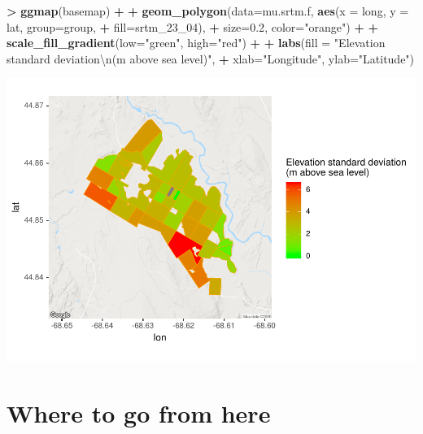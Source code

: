 \documentclass[
]{krantz}
\makeatletter
\newenvironment{Shaded}{\begin{snugshade}}{\end{snugshade}}
\newcommand{\CharTok}[1]{\textcolor[rgb]{0.5,0.5,0.5}{#1}}
\newcommand{\DataTypeTok}[1]{\textcolor[rgb]{0.27,0.27,0.27}{#1}}
\newcommand{\DecValTok}[1]{\textcolor[rgb]{0.06,0.06,0.06}{#1}}
\newcommand{\FloatTok}[1]{\textcolor[rgb]{0.06,0.06,0.06}{#1}}
\newcommand{\KeywordTok}[1]{\textcolor[rgb]{0.27,0.27,0.27}{\textbf{#1}}}
\newcommand{\NormalTok}[1]{#1}
\newcommand{\OperatorTok}[1]{\textcolor[rgb]{0.43,0.43,0.43}{\textbf{#1}}}
\newcommand{\StringTok}[1]{\textcolor[rgb]{0.5,0.5,0.5}{#1}}
\newenvironment{kframe}{%
\medskip{}
\setlength{\fboxsep}{.8em}
 \def\at@end@of@kframe{}%
 \ifinner\ifhmode%
  \def\at@end@of@kframe{\end{minipage}}%
  \begin{minipage}{\columnwidth}%
 \fi\fi%
 \def\FrameCommand##1{\hskip\@totalleftmargin \hskip-\fboxsep
 \colorbox{shadecolor}{##1}\hskip-\fboxsep
     \hskip-\linewidth \hskip-\@totalleftmargin \hskip\columnwidth}%
 \MakeFramed {\advance\hsize-\width
   \@totalleftmargin\z@ \linewidth\hsize
   \@setminipage}}%
 {\par\unskip\endMakeFramed%
 \at@end@of@kframe}
\renewenvironment{Shaded}{\begin{kframe}}{\end{kframe}}
\makeatother
\begin{document}
\begin{Shaded}
\begin{Highlighting}[]
\OperatorTok{\textgreater{}}\StringTok{ }\KeywordTok{ggmap}\NormalTok{(basemap) }\OperatorTok{+}
\OperatorTok{+}\StringTok{     }\KeywordTok{geom\_polygon}\NormalTok{(}\DataTypeTok{data=}\NormalTok{mu.srtm.f, }\KeywordTok{aes}\NormalTok{(}\DataTypeTok{x =}\NormalTok{ long, }\DataTypeTok{y =}\NormalTok{ lat, }\DataTypeTok{group=}\NormalTok{group, }
\OperatorTok{+}\StringTok{                                      }\DataTypeTok{fill=}\NormalTok{srtm\_}\DecValTok{23}\NormalTok{\_}\DecValTok{04}\NormalTok{), }
\OperatorTok{+}\StringTok{                  }\DataTypeTok{size=}\FloatTok{0.2}\NormalTok{, }\DataTypeTok{color=}\StringTok{"orange"}\NormalTok{) }\OperatorTok{+}
\OperatorTok{+}\StringTok{     }\KeywordTok{scale\_fill\_gradient}\NormalTok{(}\DataTypeTok{low=}\StringTok{"green"}\NormalTok{, }\DataTypeTok{high=}\StringTok{"red"}\NormalTok{) }\OperatorTok{+}
\OperatorTok{+}\StringTok{         }\KeywordTok{labs}\NormalTok{(}\DataTypeTok{fill =} \StringTok{"Elevation standard deviation}\CharTok{\textbackslash{}n}\StringTok{(m above sea level)"}\NormalTok{, }
\OperatorTok{+}\StringTok{          }\DataTypeTok{xlab=}\StringTok{"Longitude"}\NormalTok{, }\DataTypeTok{ylab=}\StringTok{"Latitude"}\NormalTok{)}
\end{Highlighting}
\end{Shaded}

\includegraphics{bookdown_files/figure-latex/unnamed-chunk-223-1.pdf}

\hypertarget{where-to-go-from-here}{%
\section{Where to go from here}\label{where-to-go-from-here}}
\end{document}
